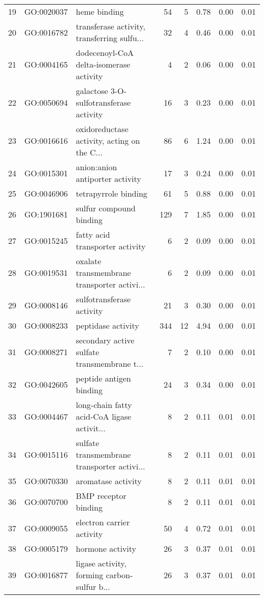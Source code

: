 \begin{table}[ht]
\begin{tabular}{rllrrrrr}
  19 & GO:0020037 & heme binding &  54 &   5 & 0.78 & 0.00 & 0.01 \\ 
  20 & GO:0016782 & transferase activity, transferring sulfu... &  32 &   4 & 0.46 & 0.00 & 0.01 \\ 
  21 & GO:0004165 & dodecenoyl-CoA delta-isomerase activity &   4 &   2 & 0.06 & 0.00 & 0.01 \\ 
  22 & GO:0050694 & galactose 3-O-sulfotransferase activity &  16 &   3 & 0.23 & 0.00 & 0.01 \\ 
  23 & GO:0016616 & oxidoreductase activity, acting on the C... &  86 &   6 & 1.24 & 0.00 & 0.01 \\ 
  24 & GO:0015301 & anion:anion antiporter activity &  17 &   3 & 0.24 & 0.00 & 0.01 \\ 
  25 & GO:0046906 & tetrapyrrole binding &  61 &   5 & 0.88 & 0.00 & 0.01 \\ 
  26 & GO:1901681 & sulfur compound binding & 129 &   7 & 1.85 & 0.00 & 0.01 \\ 
  27 & GO:0015245 & fatty acid transporter activity &   6 &   2 & 0.09 & 0.00 & 0.01 \\ 
  28 & GO:0019531 & oxalate transmembrane transporter activi... &   6 &   2 & 0.09 & 0.00 & 0.01 \\ 
  29 & GO:0008146 & sulfotransferase activity &  21 &   3 & 0.30 & 0.00 & 0.01 \\ 
  30 & GO:0008233 & peptidase activity & 344 &  12 & 4.94 & 0.00 & 0.01 \\ 
  31 & GO:0008271 & secondary active sulfate transmembrane t... &   7 &   2 & 0.10 & 0.00 & 0.01 \\ 
  32 & GO:0042605 & peptide antigen binding &  24 &   3 & 0.34 & 0.00 & 0.01 \\ 
  33 & GO:0004467 & long-chain fatty acid-CoA ligase activit... &   8 &   2 & 0.11 & 0.01 & 0.01 \\ 
  34 & GO:0015116 & sulfate transmembrane transporter activi... &   8 &   2 & 0.11 & 0.01 & 0.01 \\ 
  35 & GO:0070330 & aromatase activity &   8 &   2 & 0.11 & 0.01 & 0.01 \\ 
  36 & GO:0070700 & BMP receptor binding &   8 &   2 & 0.11 & 0.01 & 0.01 \\ 
  37 & GO:0009055 & electron carrier activity &  50 &   4 & 0.72 & 0.01 & 0.01 \\ 
  38 & GO:0005179 & hormone activity &  26 &   3 & 0.37 & 0.01 & 0.01 \\ 
  39 & GO:0016877 & ligase activity, forming carbon-sulfur b... &  26 &   3 & 0.37 & 0.01 & 0.01 \\ 

\end{tabular}
\end{table}
